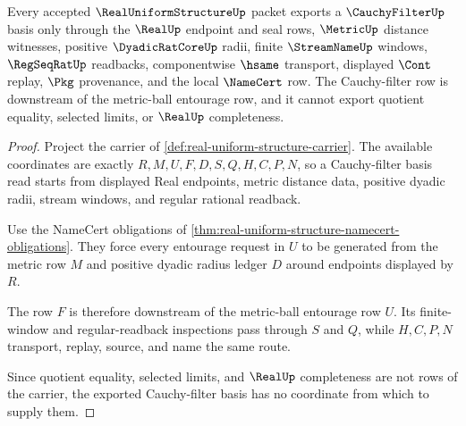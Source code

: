 \begin{theorem}
\label{thm:real-uniform-structure-cauchy-filter-basis}
Every accepted $\RealUniformStructureUp$ packet exports a $\CauchyFilterUp$ basis only through the $\RealUp$ endpoint and seal rows, $\MetricUp$ distance witnesses, positive $\DyadicRatCoreUp$ radii, finite $\StreamNameUp$ windows, $\RegSeqRatUp$ readbacks, componentwise $\hsame$ transport, displayed $\Cont$ replay, $\Pkg$ provenance, and the local $\NameCert$ row. The Cauchy-filter row is downstream of the metric-ball entourage row, and it cannot export quotient equality, selected limits, or $\RealUp$ completeness.
\end{theorem}
\begin{proof}
Project the carrier of \autoref{def:real-uniform-structure-carrier}. The available coordinates are exactly $R,M,U,F,D,S,Q,H,C,P,N$, so a Cauchy-filter basis read starts from displayed Real endpoints, metric distance data, positive dyadic radii, stream windows, and regular rational readback.

Use the NameCert obligations of \autoref{thm:real-uniform-structure-namecert-obligations}. They force every entourage request in $U$ to be generated from the metric row $M$ and positive dyadic radius ledger $D$ around endpoints displayed by $R$.

The row $F$ is therefore downstream of the metric-ball entourage row $U$. Its finite-window and regular-readback inspections pass through $S$ and $Q$, while $H,C,P,N$ transport, replay, source, and name the same route.

Since quotient equality, selected limits, and $\RealUp$ completeness are not rows of the carrier, the exported Cauchy-filter basis has no coordinate from which to supply them.
\end{proof}

